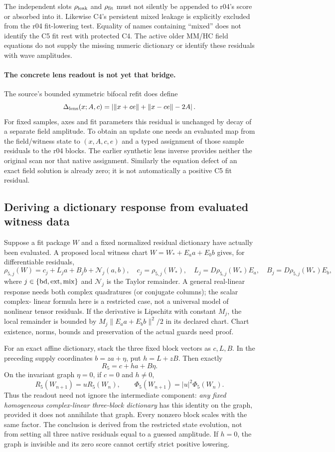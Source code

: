 \documentclass[11pt,a4paper]{article}
\begin{document}
The independent slots $\rho_{\rm leak}$ and $\rho_{\rm fit}$
must not silently be appended to r04's score or absorbed into it.
Likewise C4's persistent mixed leakage is explicitly excluded
from the r04 fit-lowering test. Equality of names containing
``mixed'' does not identify the C5 fit rest with protected C4.
The active older MM/HC field equations do not supply the missing
numeric dictionary or identify these residuals with wave amplitudes.

\paragraph{The concrete lens readout is not yet that bridge.}
The source's bounded symmetric bifocal refit does define
\[
 \Delta_{\rm lens}(x;A,c)
  =\left|\|x+ce\|+\|x-ce\|-2A\right|.
\]
For fixed samples, axes and fit parameters this residual is
unchanged by decay of a separate field amplitude. To obtain
an update one needs an evaluated map from the field/witness
state to $(x,A,c,e)$ and a typed assignment of those sample
residuals to the r04 blocks. The earlier synthetic lens inverse
provides neither the original scan nor that native assignment.
Similarly the equation defect of an exact field solution is
already zero; it is not automatically a positive C5 fit residual.

\subsection{Deriving a dictionary response from evaluated witness data}

Suppose a fit package $W$ and a fixed normalized residual
dictionary have actually been evaluated. A proposed local witness
chart $W=W_*+E_a a+E_b b$ gives, for differentiable residuals,
\[
 \rho_{5,j}(W)=c_j+L_j a+B_j b+\mathcal N_j(a,b),
 \quad c_j=\rho_{5,j}(W_*),\quad
 L_j=D\rho_{5,j}(W_*)E_a,\quad
 B_j=D\rho_{5,j}(W_*)E_b,
\]
where $j\in\{\rm bd,ext,mix\}$ and $\mathcal N_j$ is the
Taylor remainder. A general real-linear response needs both
complex quadratures (or conjugate columns); the scalar complex-
linear formula here is a restricted case, not a universal model
of nonlinear tensor residuals. If the derivative is Lipschitz
with constant $M_j$, the local remainder is bounded by
$M_j\|E_a a+E_b b\|^2/2$ in its declared chart. Chart existence,
norms, bounds and preservation of the actual guards need proof.

For an exact affine dictionary, stack the three fixed block
vectors as $c,L,B$. In the preceding supply coordinates
$b=za+\eta$, put $h=L+zB$. Then exactly
\[
 R_5=c+ha+B\eta.
\]
On the invariant graph $\eta=0$, if $c=0$ and $h\ne0$,
\[
 R_5(W_{n+1})=uR_5(W_n),\qquad
 \Phi_5(W_{n+1})=|u|^2\Phi_5(W_n).
\]
Thus the readout need not ignore the intermediate component:
\emph{any fixed homogeneous complex-linear three-block dictionary}
has this identity on the graph, provided it does not annihilate
that graph. Every nonzero block scales with the same factor.
The conclusion is derived from the restricted state evolution,
not from setting all three native residuals equal to a guessed
amplitude. If $h=0$, the graph is invisible and its zero score
cannot certify strict positive lowering.
\end{document}

